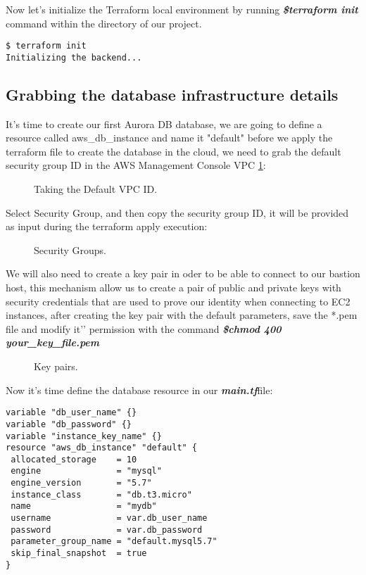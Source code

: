 \documentclass{article}
\begin{document}
Now let's initialize the Terraform local environment by running \textbf{\emph{\$terraform init}} command within the directory of our project.
\begin{lstlisting}[caption=Initializing Terraform local environment]
$ terraform init
Initializing the backend...  
\end{lstlisting}

\subsection{Grabbing the database infrastructure details}

It’s time to create our first Aurora DB database,  we are going to define a resource called aws\_db\_instance and name it "default" before we apply the terraform file to create the database in the cloud, we need to grab the default security group ID in the AWS Management Console VPC \ref{fig:DefaultVPC}:

\begin{figure}[hbt!]
\centering
\caption{\label{fig:DefaultVPC} Taking the Default VPC ID.}
\end{figure}

Select Security Group, and then copy the security group ID, it will be provided as input during the terraform apply execution:

\begin{figure}[hbt!]
\centering
\caption{\label{fig:SecurityGroup} Security Groups.}
\end{figure}

We will also need to create a key pair in oder to be able to connect to our bastion host, this mechanism allow us to create a pair of public and private keys with security credentials that are used to prove our identity when connecting to EC2 instances, after creating the key pair with the default parameters, save the *.pem file and modify it'’ permission with the command \textbf{\emph{\$chmod 400 your\_key\_file.pem}}

\begin{figure}[hbt!]
\centering
\caption{\label{fig:KeyPairs} Key pairs.}
\end{figure}
\clearpage
Now it's time define the database resource in our \textbf{\emph{main.tf}}file:

\begin{lstlisting}[caption=Terraform main file]
variable "db_user_name" {}
variable "db_password" {}
variable "instance_key_name" {}
resource "aws_db_instance" "default" {
 allocated_storage    = 10
 engine               = "mysql"
 engine_version       = "5.7"
 instance_class       = "db.t3.micro"
 name                 = "mydb"
 username             = var.db_user_name
 password             = var.db_password
 parameter_group_name = "default.mysql5.7"
 skip_final_snapshot  = true
}
\end{lstlisting}
\end{document}
